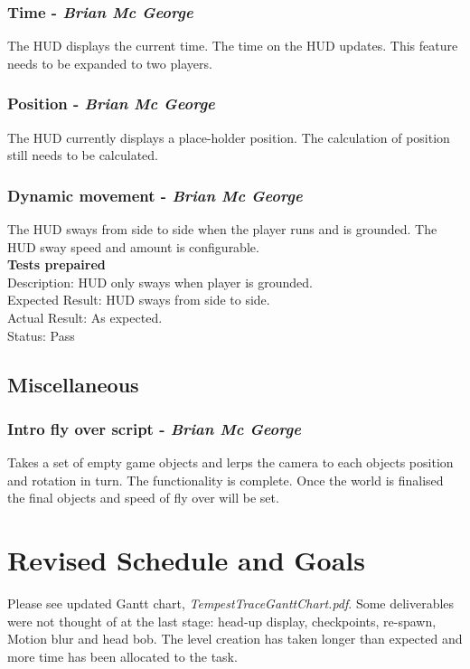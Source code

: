 \documentclass[a4paper,10pt]{article}
\begin{document}
\subsubsection{Time - \textit{Brian Mc George}}
The HUD displays the current time. The time on the HUD updates. This feature needs to be expanded to two players.
\subsubsection{Position - \textit{Brian Mc George}}
The HUD currently displays a place-holder position. The calculation of position still needs to be calculated.
\subsubsection{Dynamic movement - \textit{Brian Mc George}}
The HUD sways from side to side when the player runs and is grounded. The HUD sway speed and amount is configurable.
\smallskip\\\textbf{Tests prepaired}\\
Description: HUD only sways when player is grounded.\\
Expected Result: HUD sways from side to side.\\
Actual Result: As expected.\\
Status: Pass

\subsection{Miscellaneous}
\subsubsection{Intro fly over script - \textit{Brian Mc George}}
Takes a set of empty game objects and lerps the camera to each objects position and rotation in turn. The functionality is complete. Once the world is finalised the final objects and speed of fly over will be set. 

\section{Revised Schedule and Goals}
Please see updated Gantt chart, \textit{TempestTraceGanttChart.pdf}. Some deliverables were not thought of at the last stage: head-up display, checkpoints, re-spawn, Motion blur and head bob. The level creation has taken longer than expected and more time has been allocated to the task.
\end{document}

